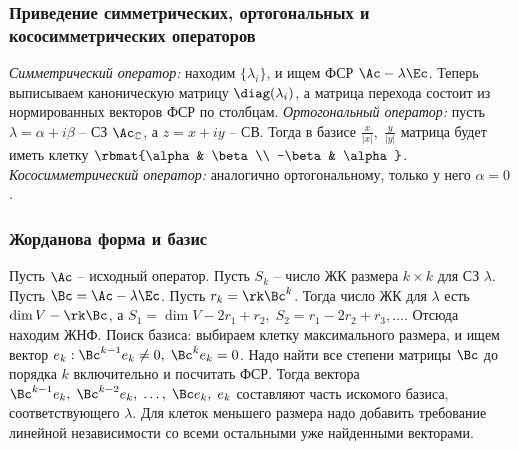 \documentclass[a4paper]{article}
\begin{document}
\subsubsection*{Приведение симметрических, ортогональных и кососимметрических операторов}
\textit{Симметрический оператор:} находим $\{\lambda_i \}$, и ищем ФСР $\Ac-\lambda \Ec$.
Теперь выписываем каноническую матрицу $\diag(\lambda_i)$, а матрица перехода состоит из
нормированных векторов ФСР по столбцам. \textit{Ортогональный оператор:} пусть $\lambda=\alpha+i\beta$ --
СЗ $\Ac_\mathbb{C}$, а $z=x+iy$ -- СВ. Тогда в базисе $\frac{x}{|x|}, \; \frac{y}{|y|}$
матрица будет иметь клетку $\rbmat{\alpha & \beta \\ -\beta & \alpha}$. \textit{Кососимметрический
оператор:} аналогично ортогональному, только у него $\alpha=0$.

\subsubsection*{Жорданова форма и базис}
Пусть $\Ac$ -- исходный оператор. Пусть $S_k$ -- число ЖК размера $k \times k$
для СЗ $\lambda$. Пусть $\Bc = \Ac - \lambda \Ec$. Пусть $r_k = \rk \Bc^k$. Тогда число
ЖК для $\lambda$ есть $\dim V - \rk \Bc$, а $S_1=\dim V - 2r_1+r_2, \; S_2=r_1-2r_2+r_3, \dots$.
Отсюда находим ЖНФ. Поиск базиса: выбираем клетку максимального размера, и ищем вектор
$e_k: \Bc^{k-1}e_k \neq 0, \; \Bc^ke_k=0$. Надо найти все степени матрицы $\Bc$ до
порядка $k$ включительно и посчитать ФСР. Тогда вектора
$\Bc^{k-1}e_k, \; \Bc^{k-2}e_k, \; \dots, \; \Bc e_k, \; e_k$
составляют часть искомого базиса, соответствующего $\lambda$. Для клеток меньшего размера
надо добавить требование линейной независимости со всеми остальными уже найденными векторами.
\end{document}

